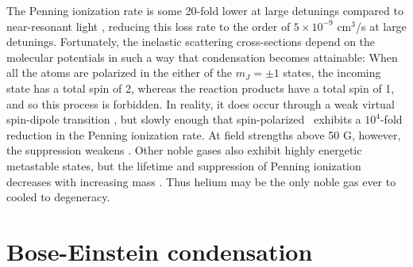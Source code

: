 	The Penning ionization rate is some 20-fold lower at large detunings compared to near-resonant light \cite{Mastwijk98}, reducing this loss rate to the order of $5\times10^{-9}$ cm$^3$/s at large detunings.
	Fortunately, the inelastic scattering cross-sections depend on the molecular potentials in such a way that condensation becomes attainable: When all the atoms are polarized in the either of the $m_J=\pm1$ states, the incoming state has a total spin of 2, whereas the reaction products have a total spin of 1, and so this process is forbidden.
	In reality, it does occur through a weak virtual spin-dipole transition \cite{Shlyapnikov94}, but slowly enough that spin-polarized \mhe~exhibits a $10^4$-fold reduction in the Penning ionization rate.
	At field strengths above 50 G, however, the suppression weakens \cite{Shlyapnikov94,Borbely12}.
	Other noble gases also exhibit highly energetic metastable states, but the lifetime and suppression of Penning ionization decreases with increasing mass \cite{Orzel99, Spoden05}.
	Thus helium may be the only noble gas ever to cooled to degeneracy.
	

	
	
\section{Bose-Einstein condensation}
\label{sec:BEC_theory}

